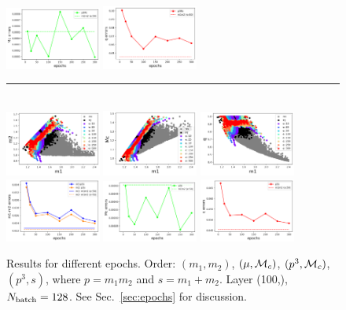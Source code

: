 \documentclass[prd,aps,twocolumn,a4paper,showkeys,nofootinbib]{revtex4-1}
\def\Mc{{\cal M}_c}
\begin{document}
\begin{figure}[]
  \includegraphics[width=0.28\textwidth]{./Figs/p3Mc_err_Mc.png}
  \includegraphics[width=0.28\textwidth]{./Figs/p3Mc_err_q.png} \\
  \rule[1ex]{14cm}{0.5pt}\\
  \includegraphics[width=0.28\textwidth]{./Figs/p3s_rainbow_m1m2.png}
  \includegraphics[width=0.28\textwidth]{./Figs/p3s_rainbow_m1Mc.png}
  \includegraphics[width=0.28\textwidth]{./Figs/p3s_rainbow_m1q.png} \\
  \includegraphics[width=0.28\textwidth]{./Figs/p3s_err_m1m2.png}
  \includegraphics[width=0.28\textwidth]{./Figs/p3s_err_Mc.png}
  \includegraphics[width=0.28\textwidth]{./Figs/p3s_err_q.png} \\
  \caption{\label{fig:epochs} Results for different epochs. Order:
  $(m_1, m_2)$, $(\mu, \Mc)$, $(p^3, \Mc)$, $(p^3, s)$, where
  $p=m_1 m_2$ and $s=m_1+m_2$. Layer (100,), $N_{\rm batch}=128$. 
  See Sec.~\ref{sec:epochs} for discussion. }
\end{figure}
\end{document}
